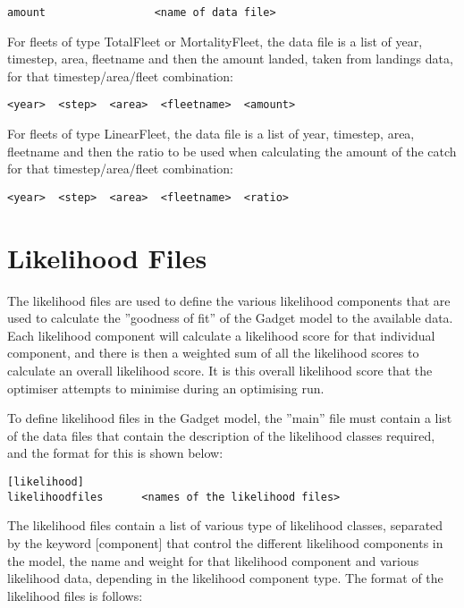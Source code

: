 \documentclass [a4paper, 10pt]{book}
\begin{document}
{\small\begin{verbatim}
amount                 <name of data file>
\end{verbatim}}

For fleets of type TotalFleet or MortalityFleet, the data file is a list of year, timestep, area, fleetname and then the amount landed, taken from landings data, for that timestep/area/fleet combination:

{\small\begin{verbatim}
<year>  <step>  <area>  <fleetname>  <amount>
\end{verbatim}}

For fleets of type LinearFleet, the data file is a list of year, timestep, area, fleetname and then the ratio to be used when calculating the amount of the catch for that timestep/area/fleet combination:

{\small\begin{verbatim}
<year>  <step>  <area>  <fleetname>  <ratio>
\end{verbatim}}

\chapter{Likelihood Files}\label{chap:like}
The likelihood files are used to define the various likelihood components that are used to calculate the ''goodness of fit'' of the Gadget model to the available data.  Each likelihood component will calculate a likelihood score for that individual component, and there is then a weighted sum of all the likelihood scores to calculate an overall likelihood score.  It is this overall likelihood score that the optimiser attempts to minimise during an optimising run.

\bigskip
To define likelihood files in the Gadget model, the ''main'' file must contain a list of the data files that contain the description of the likelihood classes required, and the format for this is shown below:

{\small\begin{verbatim}
[likelihood]
likelihoodfiles      <names of the likelihood files>
\end{verbatim}}

The likelihood files contain a list of various type of likelihood classes, separated by the keyword [component] that control the different likelihood components in the model, the name and weight for that likelihood component and various likelihood data, depending in the likelihood component type.  The format of the likelihood files is follows:
\end{document}
